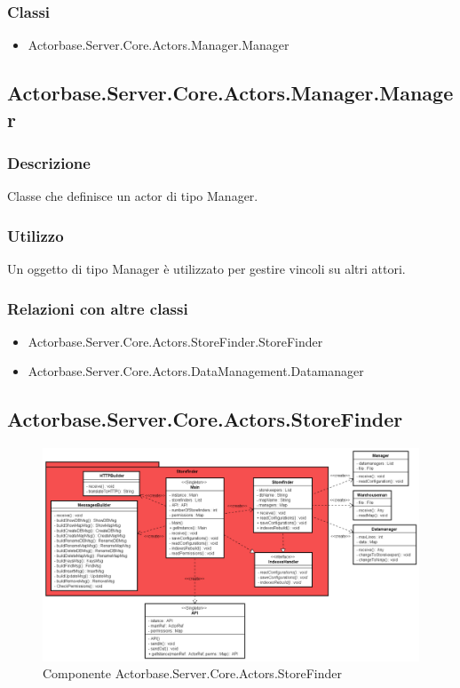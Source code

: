 \documentclass[a4paper]{article}
\begin{document}
			\subsubsection{Classi}
			\begin{itemize}
				\item Actorbase.Server.Core.Actors.Manager.Manager
			\end{itemize}
			
		\subsection{Actorbase.Server.Core.Actors.Manager.Manager}
			\subsubsection{Descrizione}
				Classe che definisce un actor di tipo Manager.
			\subsubsection{Utilizzo}
				Un oggetto di tipo Manager è utilizzato per gestire vincoli su altri attori.
			\subsubsection{Relazioni con altre classi}
			\begin{itemize}
				\item Actorbase.Server.Core.Actors.StoreFinder.StoreFinder
				\item Actorbase.Server.Core.Actors.DataManagement.Datamanager
			\end{itemize}
			
		\subsection{Actorbase.Server.Core.Actors.StoreFinder}
			\begin{figure} [H]
			\centering
			\includegraphics[width=\textwidth]{Server/Package/StorefinderLevel.png}
			\caption{Componente Actorbase.Server.Core.Actors.StoreFinder}
			\end{figure}
\end{document}
